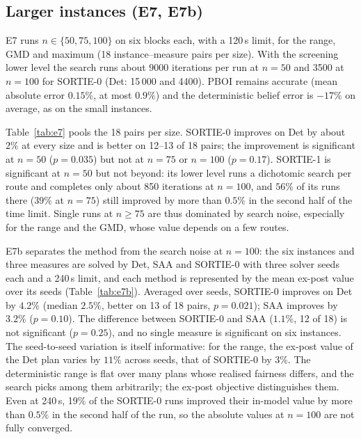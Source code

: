 \documentclass[11pt]{article}
\theoremstyle{definition}
\begin{document}
\subsection{Larger instances (E7, E7b)}
E7 runs $n\in\{50,75,100\}$ on six blocks each, with a 120\,s limit, for the
range, GMD and maximum (18 instance--measure pairs per size). With the
screening lower level the search runs about 9000 iterations per run at
$n=50$ and 3500 at $n=100$ for SORTIE-0 (Det: 15\,000 and 4400). PBOI remains
accurate (mean absolute error $0.15\%$, at most $0.9\%$) and the deterministic
belief error is $-17\%$ on average, as on the small instances.

Table~\ref{tab:e7} pools the 18 pairs per size. SORTIE-0 improves on Det by
about $2\%$ at every size and is better on 12--13 of 18 pairs; the improvement
is significant at $n=50$ ($p=0.035$) but not at $n=75$ or $n=100$
($p=0.17$). SORTIE-1 is significant at $n=50$ but not beyond: its lower level
runs a dichotomic search per route and completes only about 850 iterations at
$n=100$, and $56\%$ of its runs there ($39\%$ at $n=75$) still improved by
more than $0.5\%$ in the second half of the time limit. Single runs at $n\ge75$ are thus dominated by search
noise, especially for the range and the GMD, whose value depends on a few
routes.

E7b separates the method from the search noise at $n=100$: the six instances
and three measures are solved by Det, SAA and SORTIE-0 with three solver seeds
each and a 240\,s limit, and each method is represented by the mean ex-post
value over its seeds (Table~\ref{tab:e7b}). Averaged over seeds, SORTIE-0
improves on Det by $4.2\%$ (median $2.5\%$, better on 13 of 18 pairs,
$p=0.021$); SAA improves by $3.2\%$ ($p=0.10$). The difference between
SORTIE-0 and SAA ($1.1\%$, 12 of 18) is not significant ($p=0.25$), and no
single measure is significant on six instances. The seed-to-seed variation is
itself informative: for the range, the ex-post value of the Det plan varies by
$11\%$ across seeds, that of SORTIE-0 by $3\%$. The deterministic range is flat
over many plans whose realised fairness differs, and the search picks among
them arbitrarily; the ex-post objective distinguishes them. Even at 240\,s,
19\% of the SORTIE-0 runs improved their in-model value by more than
$0.5\%$ in the second half of the run, so the absolute values at $n=100$ are
not fully converged.

\begin{table}[t]\centering\small
\caption{E7: improvement of the ex-post value over Det, $B=1.10$, 120\,s,
pooled over six instances and three measures (range, GMD, max); format as
Table~\ref{tab:e3}.}\label{tab:e7}

\end{table}
\end{document}
